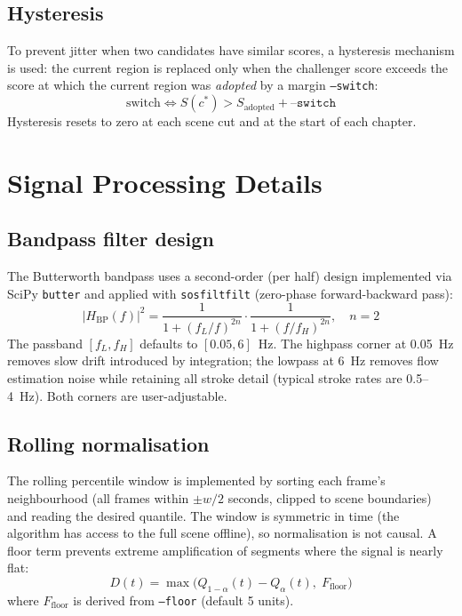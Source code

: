 \documentclass[12pt,a4paper]{article}
\begin{document}
\subsection{Hysteresis}

To prevent jitter when two candidates have similar scores, a hysteresis
mechanism is used: the current region is replaced only when the challenger
score exceeds the score at which the current region was \emph{adopted} by a
margin \texttt{--switch}:
\begin{equation}
  \text{switch} \iff S(c^*) > S_\mathrm{adopted} + \texttt{--switch}
\end{equation}
Hysteresis resets to zero at each scene cut and at the start of each chapter.

\section{Signal Processing Details}
\label{sec:signal}

\subsection{Bandpass filter design}

The Butterworth bandpass uses a second-order (per half) design implemented via
SciPy \texttt{butter} and applied with \texttt{sosfiltfilt} (zero-phase
forward-backward pass):
\begin{equation}
  |H_\mathrm{BP}(f)|^2 = \frac{1}{1+(f_L/f)^{2n}} \cdot
                          \frac{1}{1+(f/f_H)^{2n}},
  \quad n=2
\end{equation}
The passband $[f_L, f_H]$ defaults to $[0.05, 6]$~Hz. The highpass corner at
0.05~Hz removes slow drift introduced by integration; the lowpass at 6~Hz
removes flow estimation noise while retaining all stroke detail (typical stroke
rates are 0.5--4~Hz). Both corners are user-adjustable.

\subsection{Rolling normalisation}

The rolling percentile window is implemented by sorting each frame's
neighbourhood (all frames within $\pm w/2$ seconds, clipped to scene
boundaries) and reading the desired quantile. The window is symmetric in time
(the algorithm has access to the full scene offline), so normalisation is not
causal. A floor term prevents extreme amplification of segments where the
signal is nearly flat:
\begin{equation}
  D(t) = \max\!\bigl(Q_{1-\alpha}(t) - Q_\alpha(t),\; F_\mathrm{floor}\bigr)
\end{equation}
where $F_\mathrm{floor}$ is derived from \texttt{--floor} (default 5 units).
\end{document}
